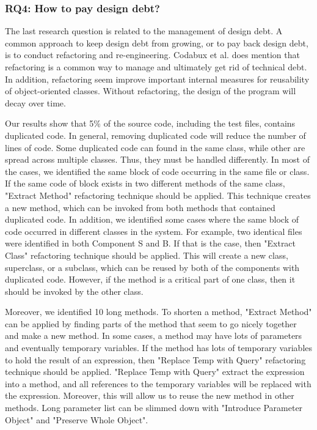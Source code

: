 
\subsubsection{RQ4: How to pay design debt?} 
The last research question is related to the management of design debt. A common approach to keep design debt from growing, or to pay back design debt, is to conduct refactoring and re-engineering. Codabux et al.\cite{p8-codabux} does mention that refactoring is a common way to manage and ultimately get rid of technical debt. In addition, refactoring seem improve important internal measures for reusability of object-oriented classes\cite{moser2006does}. Without refactoring, the design of the program will decay over time. 

Our results show that 5\% of the source code, including the test files, contains duplicated code. In general, removing duplicated code will reduce the number of lines of code. Some duplicated code can found in the same class, while other are spread across multiple classes. Thus, they must be handled differently. In most of the cases, we identified the same block of code occurring in the same file or class. If the same code of block exists in two different methods of the same class, "Extract Method" refactoring technique should be applied. This technique creates a new method, which can be invoked from both methods that contained duplicated code\cite{fowler1999refactoring}. In addition, we identified some cases where the same block of code occurred in different classes in the system. For example, two identical files were identified in both Component S and B. If that is the case, then "Extract Class" refactoring technique should be applied. This will create a new class, superclass, or a subclass, which can be reused by both of the components with duplicated code. However, if the method is a critical part of one class, then it should be invoked by the other class.

Moreover, we identified 10 long methods. To shorten a method, "Extract Method" can be applied by finding parts of the method that seem to go nicely together and make a new method\cite{fowler1999refactoring}. In some cases, a method may have lots of parameters and eventually temporary variables. If the method has lots of temporary variables to hold the result of an expression, then "Replace Temp with Query" refactoring technique should be applied\cite{fowler1999refactoring}. "Replace Temp with Query" extract the expression into a method, and all references to the temporary variables will be replaced with the expression. Moreover, this will allow us to reuse the new method in other methods. Long parameter list can be slimmed down with "Introduce Parameter Object" and "Preserve Whole Object"\cite{fowler1999refactoring}.

